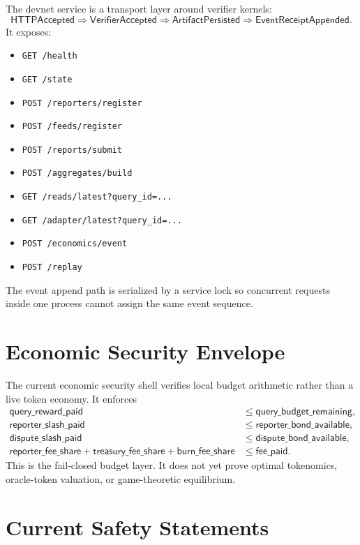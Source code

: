 \documentclass[11pt]{article}
\begin{document}
The devnet service is a transport layer around verifier kernels:
\[
  \mathsf{HTTPAccepted}
  \Rightarrow
  \mathsf{VerifierAccepted}
  \Rightarrow
  \mathsf{ArtifactPersisted}
  \Rightarrow
  \mathsf{EventReceiptAppended}.
\]
It exposes:
\begin{itemize}[leftmargin=*]
  \item \texttt{GET /health}
  \item \texttt{GET /state}
  \item \texttt{POST /reporters/register}
  \item \texttt{POST /feeds/register}
  \item \texttt{POST /reports/submit}
  \item \texttt{POST /aggregates/build}
  \item \texttt{GET /reads/latest?query\_id=...}
  \item \texttt{GET /adapter/latest?query\_id=...}
  \item \texttt{POST /economics/event}
  \item \texttt{POST /replay}
\end{itemize}
The event append path is serialized by a service lock so concurrent requests
inside one process cannot assign the same event sequence.

\section{Economic Security Envelope}

The current economic security shell verifies local budget arithmetic rather
than a live token economy. It enforces
\[
\begin{aligned}
  \mathsf{query\_reward\_paid} &\leq \mathsf{query\_budget\_remaining},\\
  \mathsf{reporter\_slash\_paid} &\leq \mathsf{reporter\_bond\_available},\\
  \mathsf{dispute\_slash\_paid} &\leq \mathsf{dispute\_bond\_available},\\
  \mathsf{reporter\_fee\_share}
  + \mathsf{treasury\_fee\_share}
  + \mathsf{burn\_fee\_share}
  &\leq \mathsf{fee\_paid}.
\end{aligned}
\]
This is the fail-closed budget layer. It does not yet prove optimal
tokenomics, oracle-token valuation, or game-theoretic equilibrium.

\section{Current Safety Statements}
\end{document}

